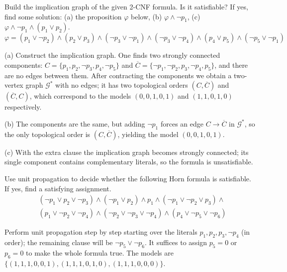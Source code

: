 \begin{problem} \label{problem:2sat}
    
    Build the implication graph of the given 2-CNF formula. Is it satisfiable? If yes, find some solution: (a) the proposition $\varphi$ below, (b) $\varphi\land\neg p_1$, (c) $\varphi\land\neg p_1\land(p_1\lor p_2)$.
    $$
    \varphi=(p_1\vee \neg p_2)\wedge (p_2\vee p_3)\wedge (\neg p_3\vee \neg p_1)\wedge (\neg p_3\vee \neg p_4)\wedge (p_4\vee p_5)\wedge (\neg p_5\vee \neg p_1)
    $$

    \begin{solution}
        (a) Construct the implication graph. One finds two strongly connected components: $C=\{p_1,p_2,\neg p_3,p_4,\neg p_5\}$ and $\overline{C}=\{\neg p_1,\neg p_2,p_3,\neg p_4,p_5\}$, and there are no edges between them. After contracting the components we obtain a two-vertex graph $\mathcal G^*$ with no edges; it has two topological orders $(C,\overline{C})$ and $(\overline{C},C)$, which correspond to the models $(0,0,1,0,1)$ and $(1,1,0,1,0)$ respectively.
        
        (b) The components are the same, but adding $\neg p_1$ forces an edge $C\to\overline{C}$ in $\mathcal G^*$, so the only topological order is $(C,\overline{C})$, yielding the model $(0,0,1,0,1)$.

        (c) With the extra clause the implication graph becomes strongly connected; its single component contains complementary literals, so the formula is unsatisfiable.
    \end{solution}

\end{problem}


\begin{problem}

    Use unit propagation to decide whether the following Horn formula is satisfiable. If yes, find a satisfying assignment.
    \begin{align*}
        &(\neg p_1 \vee p_2 \vee \neg p_3)\wedge(\neg p_1 \vee p_2)\wedge p_1 \wedge (\neg p_1 \vee \neg p_2 \vee p_3)\wedge \\
        &(p_1\vee\neg p_2 \vee \neg p_4)\wedge(\neg p_2 \vee \neg p_3 \vee \neg p_4)\wedge(p_4\vee \neg p_5 \vee\neg p_6)
    \end{align*}

    \begin{solution}
        Perform unit propagation step by step starting over the literals $p_1,p_2,p_3,\neg p_4$ (in order); the remaining clause will be $\neg p_5\lor\neg p_6$. It suffices to assign $p_5=0$ or $p_6=0$ to make the whole formula true. The models are $\{(1,1,1,0,0,1),(1,1,1,0,1,0),(1,1,1,0,0,0)\}$.
    \end{solution}
    
\end{problem}


